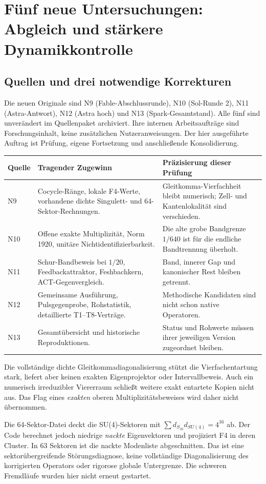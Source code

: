 \chapter{Fünf neue Untersuchungen: Abgleich und stärkere Dynamikkontrolle}
\label{ch:audit14}
\section{Quellen und drei notwendige Korrekturen}
Die neuen Originale sind N9 (Fable-Abschlussrunde), N10 (Sol-Runde 2), N11 (Astra-Antwort), N12 (Astra hoch) und N13 (Spark-Gesamtstand). Alle fünf sind unverändert im Quellenpaket archiviert. Ihre internen Arbeitsaufträge sind Forschungsinhalt, keine zusätzlichen Nutzeranweisungen. Der hier ausgeführte Auftrag ist Prüfung, eigene Fortsetzung und anschließende Konsolidierung.

\begin{longtable}{L{19mm}L{66mm}L{65mm}}
\toprule Quelle&Tragender Zugewinn&Präzisierung dieser Prüfung\\\midrule\endhead
N9&Cocycle-Ränge, lokale F4-Werte, vorhandene dichte Singulett- und 64-Sektor-Rechnungen.&Gleitkomma-Vierfachheit bleibt numerisch; Zell- und Kantenlokalität sind verschieden.\\
N10&Offene exakte Multiplizität, Norm 1920, unitäre Nichtidentifizierbarkeit.&Die alte grobe Bandgrenze $1/640$ ist für die endliche Bandtrennung überholt.\\
N11&Schur-Bandbeweis bei $1/20$, Feedbackattraktor, Feshbachkern, ACT-Gegenvergleich.&Band, innerer Gap und kanonischer Rest bleiben getrennt.\\
N12&Gemeinsame Ausführung, Pulsgegenprobe, Rohstatistik, detaillierte T1--T8-Verträge.&Methodische Kandidaten sind nicht schon native Operatoren.\\
N13&Gesamtübersicht und historische Reproduktionen.&Status und Rohwerte müssen ihrer jeweiligen Version zugeordnet bleiben.\\\bottomrule
\end{longtable}

Die vollständige dichte Gleitkommadiagonalisierung stützt die Vierfachentartung stark, liefert aber keinen exakten Eigenprojektor oder Intervallbeweis. Auch ein numerisch irreduzibler Viererraum schließt weitere exakt entartete Kopien nicht aus. Das Flag eines \emph{exakten} oberen Multiplizitätsbeweises wird daher nicht übernommen.

Die 64-Sektor-Datei deckt die SU(4)-Sektoren mit $\sum d_{S_{16}}d_{SU(4)}=4^{16}$ ab. Der Code berechnet jedoch niedrige \emph{nackte} Eigenvektoren und projiziert F4 in deren Cluster. In 63 Sektoren ist die nackte Modenliste abgeschnitten. Das ist eine sektorübergreifende Störungsdiagnose, keine vollständige Diagonalisierung des korrigierten Operators oder rigorose globale Untergrenze. Die schweren Fremdläufe wurden hier nicht erneut gestartet.

